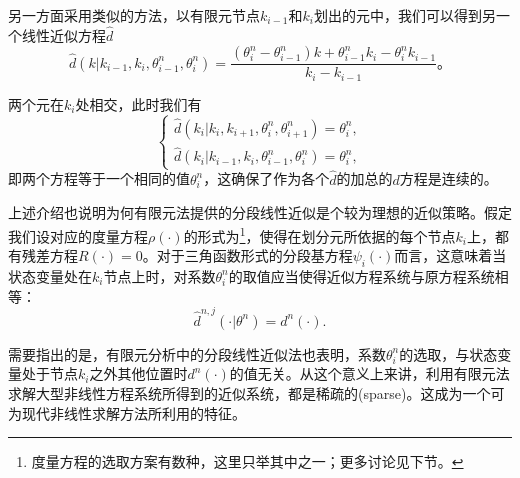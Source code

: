 另一方面采用类似的方法，以有限元节点$k_{i-1}$和$k_{i}$划出的元中，我们可以得到另一个线性近似方程$\hat{d}$
\begin{equation*}
  \hat{d} \left( k | k_{i-1}, k_{i}, \theta^n_{i-1}, \theta^n_{i} \right)=
  \frac{
  \left( \theta_{i}^n - \theta_{i-1}^n \right) k + \theta_{i-1}^n k_{i} - \theta_{i}^n k_{i-1}
  }{k_{i} - k_{i-1}}。
\end{equation*}

两个元在$k_i$处相交，此时我们有
\begin{equation*}
  \begin{cases}
    \hat{d} \left( k_{i} | k_{i}, k_{i+1}, \theta^n_i, \theta^n_{i+1} \right)  = \theta^n_i, \\
    \hat{d} \left( k_i | k_{i-1}, k_{i}, \theta^n_{i-1}, \theta^n_{i} \right)= \theta^n_i,
  \end{cases}
\end{equation*}
即两个方程等于一个相同的值$\theta^n_i$，这确保了作为各个$\hat{d}$的加总的$d$方程是连续的。

上述介绍也说明为何有限元法提供的分段线性近似是个较为理想的近似策略。假定我们设对应的度量方程$\rho(\cdot)$的形式为\footnote{度量方程的选取方案有数种，这里只举其中之一；更多讨论见下节。}，使得在划分元所依据的每个节点$k_i$上，都有残差方程$R(\cdot) = 0$。对于三角函数形式的分段基方程$\psi_i(\cdot)$而言，这意味着当状态变量处在$k_i$节点上时，对系数$\theta^n_i$的取值应当使得近似方程系统与原方程系统相等：
\begin{equation*}
  \hat{d}^{n,j}(\cdot | \theta^n) = d^n(\cdot).
\end{equation*}

需要指出的是，有限元分析中的分段线性近似法也表明，系数$\theta^n_i$的选取，与状态变量处于节点$k_i$之外其他位置时$d^n(\cdot)$的值无关。从这个意义上来讲，利用有限元法求解大型非线性方程系统所得到的近似系统，都是稀疏的(sparse)。这成为一个可为现代非线性求解方法所利用的特征。


